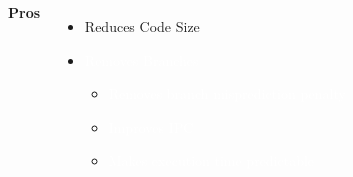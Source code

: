\begin{columns}[t] %
        \textbf{Pros}
        \begin{itemize}
            \item Reduces Code Size
            \item \textcolor{white}{Removes Branches}
            \begin{itemize}
                \item  \textcolor{white}{Removes branch misprediction penalty}
                \item  \textcolor{white}{Improves IPC}
                \item  \textcolor{white}{Makes execution time predictable}
            \end{itemize}
        \end{itemize}


\end{columns}